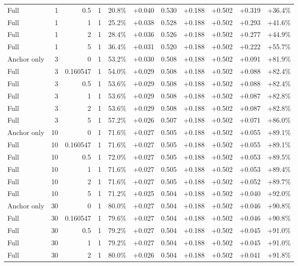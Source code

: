 \begin{table}[htbp]
\begin{tabular}{lrrrccccccc}
Full & 1 & 0.5 & 1 & 20.8\% & +0.040 & 0.530 & +0.188 & +0.502 & +0.319 & +36.4\% \\
Full & 1 & 1 & 1 & 25.2\% & +0.038 & 0.528 & +0.188 & +0.502 & +0.293 & +41.6\% \\
Full & 1 & 2 & 1 & 28.4\% & +0.036 & 0.526 & +0.188 & +0.502 & +0.277 & +44.9\% \\
Full & 1 & 5 & 1 & 36.4\% & +0.031 & 0.520 & +0.188 & +0.502 & +0.222 & +55.7\% \\
Anchor only & 3 & 0 & 1 & 53.2\% & +0.030 & 0.508 & +0.188 & +0.502 & +0.091 & +81.9\% \\
Full & 3 & 0.160547 & 1 & 54.0\% & +0.029 & 0.508 & +0.188 & +0.502 & +0.088 & +82.4\% \\
Full & 3 & 0.5 & 1 & 53.6\% & +0.029 & 0.508 & +0.188 & +0.502 & +0.088 & +82.4\% \\
Full & 3 & 1 & 1 & 53.6\% & +0.029 & 0.508 & +0.188 & +0.502 & +0.087 & +82.8\% \\
Full & 3 & 2 & 1 & 53.6\% & +0.029 & 0.508 & +0.188 & +0.502 & +0.087 & +82.8\% \\
Full & 3 & 5 & 1 & 57.2\% & +0.026 & 0.507 & +0.188 & +0.502 & +0.071 & +86.0\% \\
Anchor only & 10 & 0 & 1 & 71.6\% & +0.027 & 0.505 & +0.188 & +0.502 & +0.055 & +89.1\% \\
Full & 10 & 0.160547 & 1 & 71.6\% & +0.027 & 0.505 & +0.188 & +0.502 & +0.055 & +89.1\% \\
Full & 10 & 0.5 & 1 & 72.0\% & +0.027 & 0.505 & +0.188 & +0.502 & +0.053 & +89.5\% \\
Full & 10 & 1 & 1 & 71.6\% & +0.027 & 0.505 & +0.188 & +0.502 & +0.053 & +89.4\% \\
Full & 10 & 2 & 1 & 71.6\% & +0.027 & 0.505 & +0.188 & +0.502 & +0.052 & +89.7\% \\
Full & 10 & 5 & 1 & 71.2\% & +0.025 & 0.504 & +0.188 & +0.502 & +0.040 & +92.0\% \\
Anchor only & 30 & 0 & 1 & 80.0\% & +0.027 & 0.504 & +0.188 & +0.502 & +0.046 & +90.8\% \\
Full & 30 & 0.160547 & 1 & 79.6\% & +0.027 & 0.504 & +0.188 & +0.502 & +0.046 & +90.8\% \\
Full & 30 & 0.5 & 1 & 79.2\% & +0.027 & 0.504 & +0.188 & +0.502 & +0.045 & +91.0\% \\
Full & 30 & 1 & 1 & 79.2\% & +0.027 & 0.504 & +0.188 & +0.502 & +0.045 & +91.0\% \\
Full & 30 & 2 & 1 & 80.0\% & +0.026 & 0.504 & +0.188 & +0.502 & +0.041 & +91.8\% \\

\end{tabular}
\end{table}
